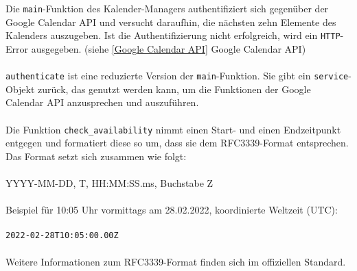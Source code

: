         Die \verb|main|-Funktion des Kalender-Managers authentifiziert sich gegenüber der Google Calendar API und versucht daraufhin, die nächsten zehn Elemente des Kalenders auszugeben. Ist die Authentifizierung nicht erfolgreich, wird ein \verb|HTTP|-Error ausgegeben. (siehe \ref{Google Calendar API} Google Calendar API) \\ \\

        \verb|authenticate| ist eine reduzierte Version der \verb|main|-Funktion. Sie gibt ein \verb|service|-Objekt zurück, das genutzt werden kann, um die Funktionen der Google Calendar API anzusprechen und auszuführen.\\
        \\ 
                
        Die Funktion \verb|check_availability| nimmt einen Start- und einen Endzeitpunkt entgegen und formatiert diese so um, dass sie dem RFC3339-Format entsprechen. Das Format setzt sich zusammen wie folgt: \\
        \\
        YYYY-MM-DD, \glq T\grq, HH:MM:SS.ms, Buchstabe \glq Z\grq \\
        \\
        Beispiel für 10:05 Uhr vormittags am 28.02.2022, koordinierte Weltzeit (UTC): \\
        \\
        \verb/2022-02-28T10:05:00.00Z/ \\
        \\
        Weitere Informationen zum RFC3339-Format finden sich im offiziellen Standard. \cite{date_time} \\
        
